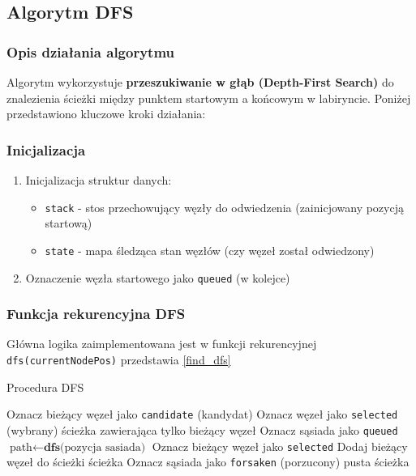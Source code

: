\documentclass[../../../../doc.tex]{subfiles}
\begin{document}
\subsection{Algorytm DFS}


\subsubsection{Opis działania algorytmu}

Algorytm wykorzystuje \textbf{przeszukiwanie w głąb (Depth-First Search)} do znalezienia ścieżki między punktem startowym a końcowym w labiryncie. Poniżej przedstawiono kluczowe kroki działania:

\subsubsection{Inicjalizacja}
\begin{enumerate}
  \item Inicjalizacja struktur danych:
        \begin{itemize}
          \item \texttt{stack} - stos przechowujący węzły do odwiedzenia (zainicjowany pozycją startową)
          \item \texttt{state} - mapa śledząca stan węzłów (czy węzeł został odwiedzony)
        \end{itemize}
  \item Oznaczenie węzła startowego jako \texttt{queued} (w kolejce)
\end{enumerate}

\subsubsection{Funkcja rekurencyjna DFS}
Główna logika zaimplementowana jest w funkcji rekurencyjnej \texttt{dfs(currentNodePos)} przedstawia \cref{find_dfs}

\begin{algorithm}
  \caption{Procedura DFS}
  \label{find_dfs}
  \begin{algorithmic}
    \STATE Oznacz bieżący węzeł jako \texttt{candidate} (kandydat)
    \STATE Oznacz węzeł jako \texttt{selected} (wybrany)
    \RETURN ścieżka zawierająca tylko bieżący węzeł
    \ENDIF
    \STATE Oznacz sąsiada jako \texttt{queued}
    \STATE $\text{path} \leftarrow \textbf{dfs}\text{(pozycja sasiada)}$
    \STATE Oznacz bieżący węzeł jako \texttt{selected}
    \STATE Dodaj bieżący węzeł do ścieżki
    \RETURN ścieżka
    \ELSE
    \STATE Oznacz sąsiada jako \texttt{forsaken} (porzucony)
    \ENDIF
    \ENDIF
    \ENDFOR
    \RETURN pusta ścieżka
  \end{algorithmic}
\end{algorithm}
\end{document}

